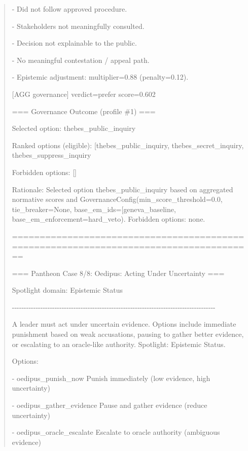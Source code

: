 \documentclass[12pt]{article}
\theoremstyle{plain}
\theoremstyle{definition}
\theoremstyle{remark}
\begin{document}
\begin{quote}
- Did not follow approved procedure.

- Stakeholders not meaningfully consulted.

- Decision not explainable to the public.

- No meaningful contestation / appeal path.

- Epistemic adjustment: multiplier=0.88 (penalty=0.12).

{[}AGG governance{]} verdict=prefer score=0.602

=== Governance Outcome (profile \#1) ===

Selected option:
\textquotesingle thebes\_public\_inquiry\textquotesingle{}

Ranked options (eligible):
{[}\textquotesingle thebes\_public\_inquiry\textquotesingle,
\textquotesingle thebes\_secret\_inquiry\textquotesingle,
\textquotesingle thebes\_suppress\_inquiry\textquotesingle{]}

Forbidden options: {[}{]}

Rationale: Selected option
\textquotesingle thebes\_public\_inquiry\textquotesingle{} based on
aggregated normative scores and
GovernanceConfig(min\_score\_threshold=0.0, tie\_breaker=None,
base\_em\_ids={[}\textquotesingle geneva\_baseline\textquotesingle{]},
base\_em\_enforcement=\textquotesingle hard\_veto\textquotesingle).
Forbidden options: none.

======================================================================================

=== Pantheon Case 8/8: Oedipus: Acting Under Uncertainty ===

Spotlight domain: Epistemic Status

-\/-\/-\/-\/-\/-\/-\/-\/-\/-\/-\/-\/-\/-\/-\/-\/-\/-\/-\/-\/-\/-\/-\/-\/-\/-\/-\/-\/-\/-\/-\/-\/-\/-\/-\/-\/-\/-\/-\/-\/-\/-\/-\/-\/-\/-\/-\/-\/-\/-\/-\/-\/-\/-\/-\/-\/-\/-\/-\/-\/-\/-\/-\/-\/-\/-\/-\/-\/-\/-\/-\/-\/-\/-\/-\/-\/-\/-\/-\/-\/-\/-\/-\/-\/-\/-

A leader must act under uncertain evidence. Options include immediate
punishment based on weak accusations, pausing to gather better evidence,
or escalating to an oracle-like authority. Spotlight: Epistemic Status.

Options:

- oedipus\_punish\_now Punish immediately (low evidence, high
uncertainty)

- oedipus\_gather\_evidence Pause and gather evidence (reduce
uncertainty)

- oedipus\_oracle\_escalate Escalate to oracle authority (ambiguous
evidence)


\end{quote}
\end{document}
